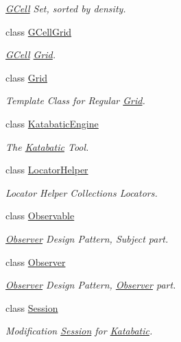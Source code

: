 \begin{DoxyCompactItemize}
\begin{DoxyCompactList}\small\item\em \mbox{\hyperlink{classKatabatic_1_1GCell}{G\+Cell}} Set, sorted by density. \end{DoxyCompactList}\item 
class \mbox{\hyperlink{classKatabatic_1_1GCellGrid}{G\+Cell\+Grid}}
\begin{DoxyCompactList}\small\item\em \mbox{\hyperlink{classKatabatic_1_1GCell}{G\+Cell}} \mbox{\hyperlink{classKatabatic_1_1Grid}{Grid}}. \end{DoxyCompactList}\item 
class \mbox{\hyperlink{classKatabatic_1_1Grid}{Grid}}
\begin{DoxyCompactList}\small\item\em Template Class for Regular \mbox{\hyperlink{classKatabatic_1_1Grid}{Grid}}. \end{DoxyCompactList}\item 
class \mbox{\hyperlink{classKatabatic_1_1KatabaticEngine}{Katabatic\+Engine}}
\begin{DoxyCompactList}\small\item\em The \mbox{\hyperlink{namespaceKatabatic}{Katabatic}} Tool. \end{DoxyCompactList}\item 
class \mbox{\hyperlink{classKatabatic_1_1LocatorHelper}{Locator\+Helper}}
\begin{DoxyCompactList}\small\item\em Locator Helper Collection\textquotesingle{}s Locators. \end{DoxyCompactList}\item 
class \mbox{\hyperlink{classKatabatic_1_1Observable}{Observable}}
\begin{DoxyCompactList}\small\item\em \mbox{\hyperlink{classKatabatic_1_1Observer}{Observer}} Design Pattern, Subject part. \end{DoxyCompactList}\item 
class \mbox{\hyperlink{classKatabatic_1_1Observer}{Observer}}
\begin{DoxyCompactList}\small\item\em \mbox{\hyperlink{classKatabatic_1_1Observer}{Observer}} Design Pattern, \mbox{\hyperlink{classKatabatic_1_1Observer}{Observer}} part. \end{DoxyCompactList}\item 
class \mbox{\hyperlink{classKatabatic_1_1Session}{Session}}
\begin{DoxyCompactList}\small\item\em Modification \mbox{\hyperlink{classKatabatic_1_1Session}{Session}} for \mbox{\hyperlink{namespaceKatabatic}{Katabatic}}. \end{DoxyCompactList}\end{DoxyCompactItemize}
